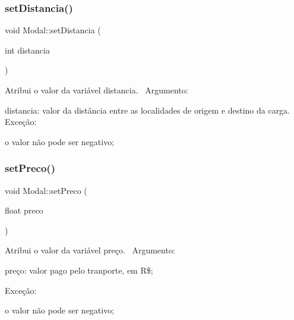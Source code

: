 \subsubsection{\texorpdfstring{set\+Distancia()}{setDistancia()}}
{\footnotesize\ttfamily void Modal\+::set\+Distancia (\begin{DoxyParamCaption}\item[{int}]{distancia }\end{DoxyParamCaption})}

Atribui o valor da variável distancia.~\newline
Argumento\+:
\begin{DoxyItemize}
\item distancia\+: valor da distância entre as localidades de origem e destino da carga.~\newline
Exceção\+:
\begin{DoxyItemize}
\item o valor não pode ser negativo;
\end{DoxyItemize}
\end{DoxyItemize}\mbox{\label{classModal_ade6a106d1c7a0bc095ea1a012891ed00}} 
\subsubsection{\texorpdfstring{set\+Preco()}{setPreco()}}
{\footnotesize\ttfamily void Modal\+::set\+Preco (\begin{DoxyParamCaption}\item[{float}]{preco }\end{DoxyParamCaption})}

Atribui o valor da variável preço.~\newline
 Argumento\+:
\begin{DoxyItemize}
\item preço\+: valor pago pelo tranporte, em R\$;~\newline

\end{DoxyItemize}

Exceção\+:~\newline

\begin{DoxyItemize}
\item o valor não pode ser negativo;~\newline
 
\end{DoxyItemize}\mbox{\label{classModal_ac8da271cfb67468b89cbca0b3951b9f7}} 
